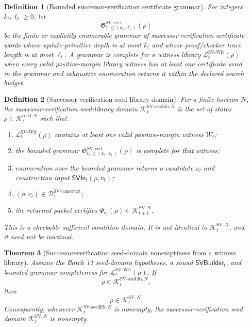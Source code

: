 \documentclass[11pt]{article}
\newtheorem{theorem}{Theorem}[section]
\newtheorem{definition}[theorem]{Definition}
\newcommand{\Lcal}{\mathcal{L}}
\newcommand{\1}{\mathbf{1}}
\providecommand{\Dcal}{\mathcal{D}}
\providecommand{\Kcal}{\mathcal{K}}
\begin{document}
\begin{definition}[Bounded successor-verification certificate grammar]
\label{def:batch12b_bounded_sv_certificate_grammar}
For integers \(k_t,\ell_t\ge0\), let
\[
\mathfrak G_{t,\le(k_t,\ell_t)}^{\mathrm{SV\mbox{-}cert}}(\rho)
\]
be the finite or explicitly enumerable grammar of successor-verification certificate words whose update-primitive depth is at most \(k_t\) and whose proof/checker trace length is at most \(\ell_t\).  A grammar is complete for a witness library \(\Lcal_t^{\mathrm{SV\mbox{-}Wit}}(\rho)\) when every valid positive-margin library witness has at least one certificate word in the grammar and exhaustive enumeration returns it within the declared search budget.
\end{definition}

\begin{definition}[Successor-verification seed-library domain]
\label{def:batch12b_sv_seed_library_domain}
For a finite horizon \(N\), the successor-verification seed-library domain \(\Kcal_t^{\mathrm{SV\mbox{-}seedlib},N}\) is the set of states \(\rho\in\Kcal_t^{\mathrm{seed},N}\) such that:
\begin{enumerate}[label=(\roman*),leftmargin=1.5em]
    \item \(\Lcal_t^{\mathrm{SV\mbox{-}Wit}}(\rho)\) contains at least one valid positive-margin witness \(W_t\);
    \item the bounded grammar \(\mathfrak G_{t,\le(k_t,\ell_t)}^{\mathrm{SV\mbox{-}cert}}(\rho)\) is complete for that witness;
    \item enumeration over the bounded grammar returns a candidate \(\nu_t\) and construction input \(\mathsf{SVIn}_t(\rho,\nu_t)\);
    \item \((\rho,\nu_t)\in\Dcal_t^{\mathrm{SV\mbox{-}construct}}\);
    \item the returned packet certifies \(\Phi_{\nu_t}(\rho)\in\Kcal_{t+1}^{\mathrm{SV},N}\).
\end{enumerate}
This is a checkable sufficient-condition domain.  It is not identical to \(\Kcal_t^{\mathrm{SV},N}\), and it need not be maximal.
\end{definition}

\begin{theorem}[Successor-verification seed-domain nonemptiness from a witness library]
\label{thm:batch12b_sv_seed_domain_nonemptiness}
Assume the Batch 11 seed-domain hypotheses, a sound \(\mathsf{SVBuilder}_t\), and bounded-grammar completeness for \(\Lcal_t^{\mathrm{SV\mbox{-}Wit}}(\rho)\).  If
\[
\rho\in\Kcal_t^{\mathrm{SV\mbox{-}seedlib},N},
\]
then
\[
\rho\in\Kcal_t^{\mathrm{SV},N}.
\]
Consequently, whenever \(\Kcal_t^{\mathrm{SV\mbox{-}seedlib},N}\) is nonempty, the successor-verification seed domain \(\Kcal_t^{\mathrm{SV},N}\) is nonempty.
\end{theorem}
\end{document}
